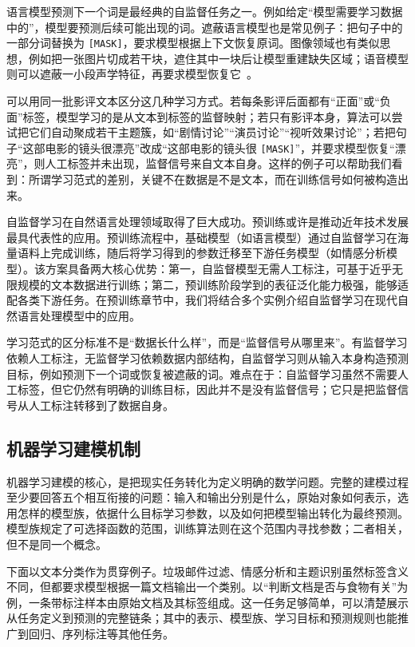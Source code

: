 语言模型预测下一个词是最经典的自监督任务之一。例如给定“模型需要学习数据中的”，模型要预测后续可能出现的词。遮蔽语言模型也是常见例子：把句子中的一部分词替换为 \texttt{[MASK]}，要求模型根据上下文恢复原词。图像领域也有类似思想，例如把一张图片切成若干块，遮住其中一块后让模型重建缺失区域；语音模型则可以遮蔽一小段声学特征，再要求模型恢复它~\cite{DevlinEtAl2019BERT,HeEtAl2022MAE,BaevskiEtAl2020Wav2vec}。

可以用同一批影评文本区分这几种学习方式。若每条影评后面都有“正面”或“负面”标签，模型学习的是从文本到标签的监督映射；若只有影评本身，算法可以尝试把它们自动聚成若干主题簇，如“剧情讨论”“演员讨论”“视听效果讨论”；若把句子“这部电影的镜头很漂亮”改成“这部电影的镜头很 \texttt{[MASK]}”，并要求模型恢复“漂亮”，则人工标签并未出现，监督信号来自文本自身。这样的例子可以帮助我们看到：所谓学习范式的差别，关键不在数据是不是文本，而在训练信号如何被构造出来。


自监督学习在自然语言处理领域取得了巨大成功。预训练或许是推动近年技术发展最具代表性的应用。预训练流程中，基础模型（如语言模型）通过自监督学习在海量语料上完成训练，随后将学习得到的参数迁移至下游任务模型（如情感分析模型）。该方案具备两大核心优势：第一，自监督模型无需人工标注，可基于近乎无限规模的文本数据进行训练；第二，预训练阶段学到的表征泛化能力极强，能够适配各类下游任务。在预训练章节中，我们将结合多个实例介绍自监督学习在现代自然语言处理模型中的应用。



\begin{importantnote}
  学习范式的区分标准不是“数据长什么样”，而是“监督信号从哪里来”。有监督学习依赖人工标注，无监督学习依赖数据内部结构，自监督学习则从输入本身构造预测目标，例如预测下一个词或恢复被遮蔽的词。难点在于：自监督学习虽然不需要人工标签，但它仍然有明确的训练目标，因此并不是没有监督信号；它只是把监督信号从人工标注转移到了数据自身。
\end{importantnote}
 
\subsection{机器学习建模机制}

机器学习建模的核心，是把现实任务转化为定义明确的数学问题。完整的建模过程至少要回答五个相互衔接的问题：输入和输出分别是什么，原始对象如何表示，选用怎样的模型族，依据什么目标学习参数，以及如何把模型输出转化为最终预测。模型族规定了可选择函数的范围，训练算法则在这个范围内寻找参数；二者相关，但不是同一个概念。

下面以文本分类作为贯穿例子。垃圾邮件过滤、情感分析和主题识别虽然标签含义不同，但都要求模型根据一篇文档输出一个类别。以“判断文档是否与食物有关”为例，一条带标注样本由原始文档及其标签组成。这一任务足够简单，可以清楚展示从任务定义到预测的完整链条；其中的表示、模型族、学习目标和预测规则也能推广到回归、序列标注等其他任务。

